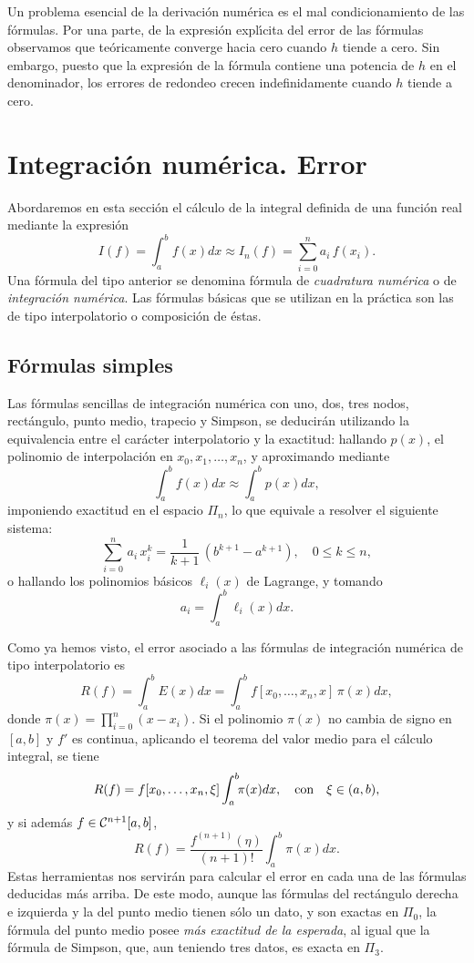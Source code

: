 \bigskip

Un problema esencial de la derivaci\'on num\'erica es el mal
condicionamiento de las f\'ormulas. Por una parte, de la expresi\'on expl\'{\i}cita del
error de las f\'ormulas observamos que te\'oricamente converge
hacia cero cuando $h$ tiende a cero. Sin embargo, puesto que la
expresi\'on de la f\'ormula contiene una potencia de $h$ en el denominador,
los errores de redondeo crecen indefinidamente cuando $h$ tiende a cero.


\section{Integración numérica. Error}

Abordaremos en esta secci\'on el c\'alculo de la integral definida de una funci\'on real mediante la expresi\'on 
\begin{equation}\label{eq:integral}
  I(f) = \int_a^b\!\! f(x) dx \approx  I_n(f) = \sum_{i=0}^n a_i\, f(x_i).
\end{equation}
Una f\'ormula del tipo anterior se denomina f\'ormula de {\it cuadratura num\'erica\/} o de {\it 
integraci\'on num\'erica}. Las f\'ormulas b\'asicas que se utilizan en la pr\'actica son las de tipo interpolatorio o composici\'on de \'estas. 

\subsection{F\'ormulas simples}
Las f\'ormulas sencillas de integraci\'on num\'erica con uno, dos, tres nodos, rect\'{a}ngulo, punto medio, trapecio y Simpson, se
deducir\'an utilizando la equivalencia entre el car\'acter interpolatorio y la exactitud:
hallando $p(x)$, el polinomio de interpolaci\'{o}n en $x_0, x_1, \ldots, x_n$, y aproximando mediante
      $$\int_a^b\!\! f(x) dx \approx \int_a^b\!\! p(x) dx,$$
imponiendo exactitud en el espacio $\Pi_n$, lo que equivale a resolver el siguiente sistema:
$$\sum_{i=0}^n \, a_i \, x_i^k  =  \frac{1}{k+1}\,(b^{k+1}-a^{k+1}), \quad
                           0 \le k \le n,
$$
o hallando los polinomios b\'asicos $\ell_i(x)$ de Lagrange, y tomando
 $$a_i
=\int_a^b\!\! \ell_i(x) dx.$$

Como ya hemos visto, el error asociado a las f\'ormulas de integraci\'on num\'erica de tipo interpolatorio es
$$
  R(f) = \int_a^b\!\! E(x) dx = \int_a^b\!\! f[x_0,\ldots,x_n,x]\, \pi(x) dx, 
$$
donde $\pi(x) = \prod_{i=0}^n (x-x_i)$. Si el polinomio $\pi(x)$ no cambia de signo en
$[a,b]$ y $f'$ es continua, aplicando el teorema del valor
medio para el c\'alculo integral, se tiene
$$
  R(f) = f[x_0,\ldots,x_n,\xi] \int_a^b\!\! \pi(x)dx,\quad
  \hbox{con}\quad \xi \in (a,b),
$$
y si adem\'as $f \in {\cal C}^{n+1}[a,b]$, 
$$
  R(f) = \frac{f^{(n+1)}(\eta)}{(n+1)!} \int_a^b\!\! \pi(x) dx.
$$
Estas herramientas nos servir\'an para calcular el error en cada una de las f\'ormulas deducidas m\'as arriba.
De este modo, aunque las f\'ormulas del rect\'angulo derecha e izquierda y la del punto medio tienen s\'olo 
un dato, y son exactas en $\Pi_0$, la f\'ormula del punto medio posee {\it m\'as exactitud de la esperada}, 
al igual que la f\'ormula de Simpson, que, aun teniendo tres datos, es exacta en $\Pi_3$.


